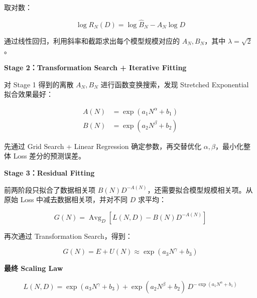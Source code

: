 \documentclass[
  11pt,
  a4paper,
  fontset=none]{ctexart}
\newenvironment{NotesFormula}{%
  \par\noindent\begin{minipage}{\linewidth}%
  \setlength{\parindent}{2em}%
  \setlength{\parskip}{0.35em}%
}{\end{minipage}\par}
\begin{document}
\begin{NotesFormula}

取对数：

\[\log R_N(D)=\log\hat B_N-A_N\log D\]

\end{NotesFormula}

通过线性回归，利用斜率和截距求出每个模型规模对应的 \(A_N,B_N\)，其中
\(\lambda=\sqrt2\)。

\textbf{Stage 2：Transformation Search + Iterative Fitting}

\begin{NotesFormula}

对 Stage 1 得到的离散 \(A_N,B_N\) 进行函数变换搜索，发现 Stretched
Exponential 拟合效果最好：

\[\boxed{
\begin{aligned}
A(N)&=\exp(a_1N^\alpha+b_1)\\
B(N)&=\exp(a_2N^\beta+b_2)
\end{aligned}}\]

\end{NotesFormula}

先通过 Grid Search + Linear Regression 确定参数，再交替优化
\(\alpha,\beta\)，最小化整体 Loss 差分的预测误差。

\textbf{Stage 3：Residual Fitting}

\begin{NotesFormula}

前两阶段只拟合了数据相关项
\(B(N)D^{-A(N)}\)，还需要拟合模型规模相关项。从原始 Loss
中减去数据相关项，并对不同 \(D\) 求平均：

\[G(N)=\operatorname{Avg}_D\left[L(N,D)-B(N)D^{-A(N)}\right]\]

\end{NotesFormula}

\begin{NotesFormula}

再次通过 Transformation Search，得到：

\[\boxed{G(N)=E+U(N)\approx\exp(a_3N^\gamma+b_3)}\]

\end{NotesFormula}

\begin{NotesFormula}

\textbf{最终 Scaling Law}

\[\boxed{L(N,D)=\exp(a_3N^\gamma+b_3)+\exp(a_2N^\beta+b_2)\,D^{-\exp(a_1N^\alpha+b_1)}}\]

\end{NotesFormula}
\end{document}

